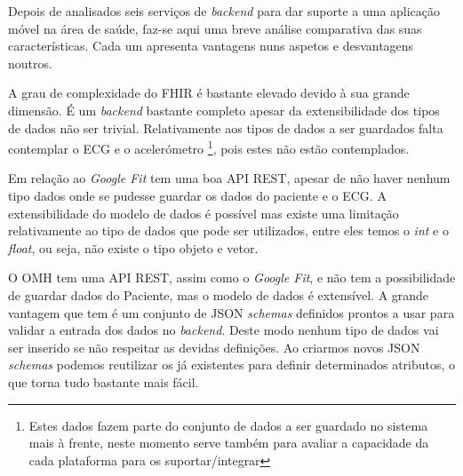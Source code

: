Depois de analisados seis serviços de \textit{backend} para dar suporte a uma aplicação móvel na área de saúde, faz-se aqui uma breve análise comparativa das suas características. Cada um apresenta vantagens nuns aspetos e desvantagens noutros.
\par 
A grau de complexidade do \gls{FHIR} é bastante elevado devido à sua grande dimensão. É um \textit{backend} bastante completo apesar da extensibilidade dos tipos de dados não ser trivial. Relativamente aos tipos de dados a ser guardados falta contemplar o \gls{ECG} e o acelerómetro \footnote{Estes dados fazem parte do conjunto de dados a ser guardado no sistema mais à frente, neste momento serve também para avaliar a capacidade da cada plataforma para os suportar/integrar}, pois estes não estão contemplados.
\par 
Em relação ao \textit{Google Fit} tem uma boa \gls{API} \gls{REST}, apesar de não haver nenhum tipo dados onde se pudesse guardar os dados do paciente e o \gls{ECG}. A extensibilidade do modelo de dados é possível mas existe uma limitação relativamente ao tipo de dados que pode ser utilizados, entre eles temos o \textit{int} e o \textit{float}, ou seja, não existe o tipo objeto e vetor.
\par 
O \gls{OMH} tem uma \gls{API} \gls{REST}, assim como o \textit{Google Fit}, e não tem a possibilidade de guardar dados do Paciente, mas o modelo de dados é extensível. A grande vantagem que tem é um conjunto de \gls{JSON} \textit{schemas} definidos prontos a usar para validar a entrada dos dados no \textit{backend}. Deste modo nenhum tipo de dados vai ser inserido se não respeitar as devidas definições. Ao criarmos novos \gls{JSON} \textit{schemas} podemos reutilizar os já existentes para definir determinados atributos, o que torna tudo bastante mais fácil.


\cleardoublepage